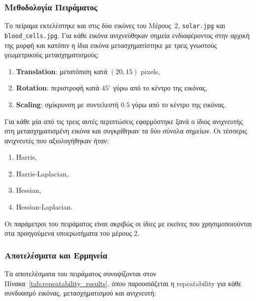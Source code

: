 \documentclass[12pt, a4paper]{article}
\begin{document}
\subsubsection{Μεθοδολογία Πειράματος}

Το πείραμα εκτελέστηκε και στις δύο εικόνες του Μέρους~2,
\texttt{solar.jpg} και \texttt{blood\_cells.jpg}. Για κάθε εικόνα ανιχνεύθηκαν
σημεία ενδιαφέροντος στην αρχική της μορφή και κατόπιν η ίδια εικόνα
μετασχηματίστηκε με τρεις γνωστούς γεωμετρικούς μετασχηματισμούς:
\begin{enumerate}
    \item \textbf{Translation}: μετατόπιση κατά $(20, 15)$ pixels,
    \item \textbf{Rotation}: περιστροφή κατά $45^\circ$ γύρω από το κέντρο της εικόνας,
    \item \textbf{Scaling}: σμίκρυνση με συντελεστή $0.5$ γύρω από το κέντρο της εικόνας.
\end{enumerate}

Για κάθε μία από τις τρεις αυτές περιπτώσεις εφαρμόστηκε ξανά ο ίδιος
ανιχνευτής στη μετασχηματισμένη εικόνα και συγκρίθηκαν τα δύο σύνολα σημείων.
Οι τέσσερις ανιχνευτές που αξιολογήθηκαν ήταν:
\begin{enumerate}
    \item Harris,
    \item Harris-Laplacian,
    \item Hessian,
    \item Hessian-Laplacian.
\end{enumerate}

Οι παράμετροι του πειράματος είναι ακριβώς οι ίδιες με εκείνες που
χρησιμοποιούνται στα προηγούμενα υποερωτήματα του μέρους 2.

\subsubsection{Αποτελέσματα και Ερμηνεία}

Τα αποτελέσματα του πειράματος συνοψίζονται στον Πίνακα~\ref{tab:repeatability_results}, όπου παρουσιάζεται η repeatability για κάθε συνδυασμό εικόνας, μετασχηματισμού και ανιχνευτή:
\end{document}

